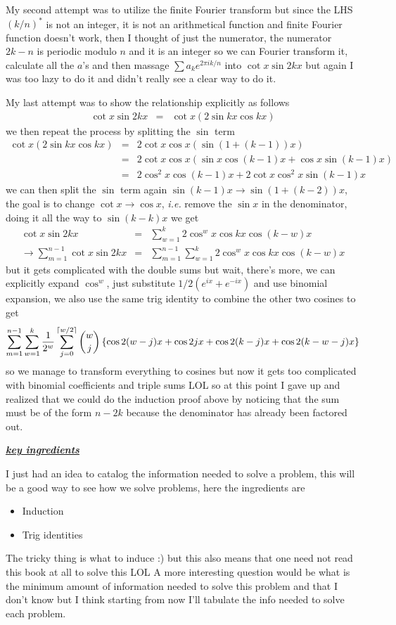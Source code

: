 \documentclass[aps,preprint,preprintnumbers,nofootinbib,showpacs,prd]{revtex4-1}
\newcommand{\ie}{{\it i.e.} }
\newcommand{\bit}{\begin{itemize}}
\newcommand{\eit}{\end{itemize}}
\newcommand{\nbea}{\begin{eqnarray*}}
\newcommand{\neea}{\end{eqnarray*}}
\DeclarePairedDelimiter{\ceil}{\lceil}{\rceil}
\begin{document}
My second attempt was to utilize the finite Fourier transform but since the LHS $(k/n)^*$ is not an integer, it is not an arithmetical function and finite Fourier function doesn't work, then I thought of just the numerator, the numerator $2k - n$ is periodic modulo $n$ and it is an integer so we can Fourier transform it, calculate all the $a$'s and then massage $\sum a_k e^{2\pi i k/n}$ into $\cot x \sin 2kx$ but again I was too lazy to do it and didn't really see a clear way to do it.

My last attempt was to show the relationship explicitly as follows
%
\nbea
\cot x \sin 2kx & = & \cot x (2 \sin kx \cos kx)
\neea
%
we then repeat the process by splitting the $\sin$ term
%
\nbea
\cot x (2 \sin kx \cos kx) & = & 2 \cot x \cos x (\sin (1 + (k-1))x) \\
& = & 2 \cot x \cos x (\sin x \cos (k-1)x + \cos x \sin(k-1)x) \\
& = & 2 \cos^2 x \cos(k-1)x + 2\cot x \cos^2 x\sin(k-1)x 
\neea
%
we can then split the $\sin$ term again $\sin(k-1)x \to \sin(1 + (k-2))x$, the goal is to change $\cot x \to \cos x$, \ie remove the $\sin x$ in the denominator, doing it all the way to $\sin(k-k)x$ we get
%
\nbea
\cot x \sin 2kx & = & \sum_{w=1}^k 2 \cos^w x \cos kx \cos (k-w)x \\
\to \sum_{m=1}^{n-1}\cot x \sin 2kx & = & \sum_{m=1}^{n-1}\sum_{w=1}^k 2 \cos^w x \cos kx \cos (k-w)x
\neea
%
but it gets complicated with the double sums but wait, there's more, we can explicitly expand $\cos^w$, just substitute $1/2(e^{ix} + e^{-ix})$ and use binomial expansion, we also use the same trig identity to combine the other two cosines to get
%
\nbea
\sum_{m=1}^{n-1} \sum_{w=1}^k \frac{1}{2^w} \sum_{j=0}^{\ceil{w/2}} \binom{w}{j} \left\{ \cos2(w-j)x + \cos 2jx + \cos2(k-j)x + \cos2(k-w-j)x \right \}
\neea
%
so we manage to transform everything to cosines but now it gets too complicated with binomial coefficients and triple sums LOL so at this point I gave up and realized that we could do the induction proof above by noticing that the sum must be of the form $n - 2k$ because the denominator has already been factored out.

\smallskip
\underline{\textit{\textbf{key ingredients}}}
\smallskip

I just had an idea to catalog the information needed to solve a problem, this will be a good way to see how we solve problems, here the ingredients are
\vspace{-\topsep}
%
\bit
\setlength\itemsep{-0.5em}
%
\item Induction
%
\item Trig identities
%
\eit
%
\vspace{-\topsep}
The tricky thing is what to induce :) but this also means that one need not read this book at all to solve this LOL A more interesting question would be what is the minimum amount of information needed to solve this problem and that I don't know but I think starting from now I'll tabulate the info needed to solve each problem.
\end{document}
